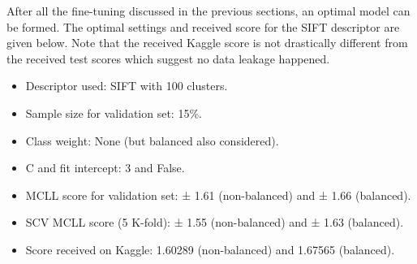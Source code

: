 After all the fine-tuning discussed in the previous sections, an optimal model can be formed.
The optimal settings and received score for the SIFT descriptor are given below.
Note that the received Kaggle score is not drastically different from the received test scores which suggest no data leakage happened.
\begin{itemize}
    \item Descriptor used: SIFT with 100 clusters.
    \item Sample size for validation set: 15\%.
    \item Class weight: None (but balanced also considered).
    \item C and fit intercept: 3 and False.
    \item MCLL score for validation set: ± 1.61 (non-balanced) and ± 1.66 (balanced).
    \item SCV MCLL score (5 K-fold): ± 1.55 (non-balanced) and ± 1.63 (balanced).
    \item Score received on Kaggle: 1.60289 (non-balanced) and 1.67565 (balanced).
\end{itemize}